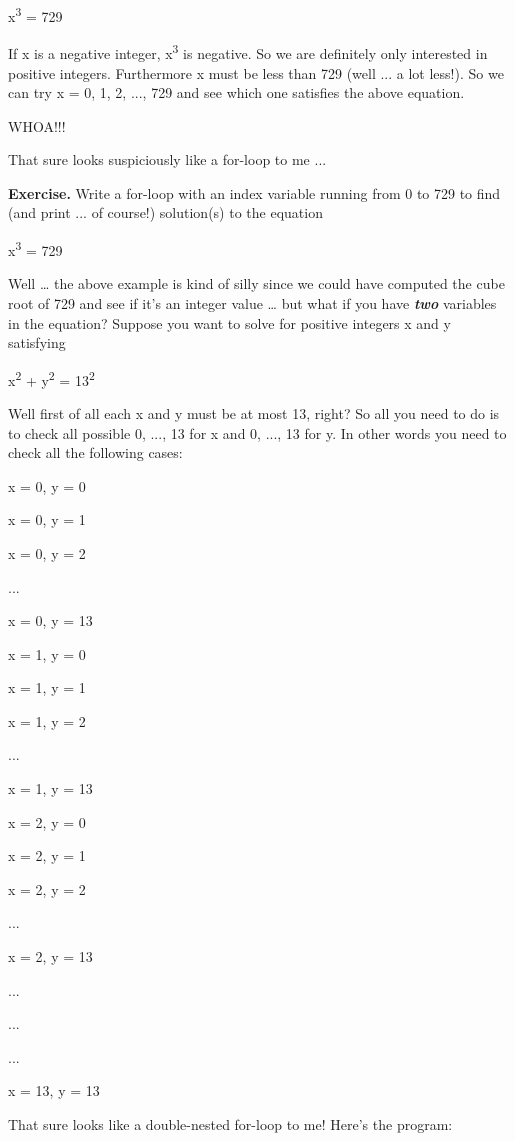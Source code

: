 \documentclass[
]{article}
\begin{document}
x\textsuperscript{3} = 729

If x is a negative integer, x\textsuperscript{3} is negative. So we are
definitely only interested in positive integers. Furthermore x must be
less than 729 (well ... a lot less!). So we can try x = 0, 1, 2, ...,
729 and see which one satisfies the above equation.

WHOA!!!

That sure looks suspiciously like a for-loop to me ...

\textbf{Exercise.} Write a for-loop with an index variable running from
0 to 729 to find (and print ... of course!) solution(s) to the equation

x\textsuperscript{3} = 729

Well \ldots{} the above example is kind of silly since we could have
computed the cube root of 729 and see if it's an integer value \ldots{}
but what if you have \emph{\textbf{two}} variables in the equation?
Suppose you want to solve for positive integers x and y satisfying

x\textsuperscript{2} + y\textsuperscript{2 }= 13\textsuperscript{2}

Well first of all each x and y must be at most 13, right? So all you
need to do is to check all possible 0, ..., 13 for x and 0, ..., 13 for
y. In other words you need to check all the following cases:

x = 0, y = 0

x = 0, y = 1

x = 0, y = 2

...

x = 0, y = 13

x = 1, y = 0

x = 1, y = 1

x = 1, y = 2

...

x = 1, y = 13

x = 2, y = 0

x = 2, y = 1

x = 2, y = 2

...

x = 2, y = 13

...

...

...

x = 13, y = 13

That sure looks like a double-nested for-loop to me! Here's the program:
\end{document}
